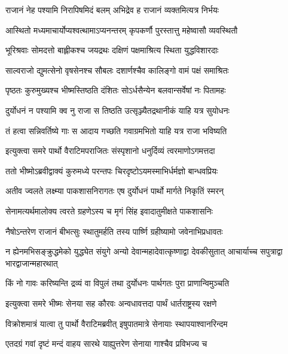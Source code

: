 \twolineshloka
{राजानं नेह पश्यामि निरापिषमिदं बलम्}
{अभिद्रेव ह राजानं व्यक्तमित्यत्र निर्भयः}


\twolineshloka
{आस्थितो मध्यमाचार्योप्यश्वत्थामाऽप्यनन्तरम्}
{कृपकर्णौ पुरस्तात्तु महेष्वासौ व्यवस्थितौ}


\twolineshloka
{भूरिश्रवाः सोमदत्तो बाह्लीकश्च जयद्रथः}
{दक्षिणं पक्षमाश्रित्य स्थिता युद्धविशारदाः}


\twolineshloka
{साल्वराजो द्युमत्सेनो वृषसेनश्च सौबलः}
{दशार्णश्चैव कालिङ्गो वामं पक्षं समाश्रितः}


\twolineshloka
{पृष्ठतः कुरुमुख्यश्च भीष्मस्तिष्ठति दंशितः}
{सोऽर्धसैन्येन बलवान्सर्वेषां नः पितामहः}


\twolineshloka
{दुर्योधनं न पश्यामि क्व नु राजा स तिष्ठति}
{उत्सृञ्ज्यैतद्रथानीकं याहि यत्र सुयोधनः}


\twolineshloka
{तं हत्वा सन्निवर्तिष्ये गाः स आदाय गच्छति}
{गवाग्रमभितो याहि यत्र राजा भविष्यति}



\twolineshloka
{इत्युक्त्वा समरे पार्थो वैराटिमपराजितः}
{संस्पृशानो धनुर्दिव्यं त्वरमाणोऽगमत्तदा}


\twolineshloka
{ततो भीष्मोऽब्रवीद्वाक्यं कुरुमध्ये परन्तपः}
{चिरदृष्टोऽयमस्माभिर्धर्मज्ञो बान्धवप्रियः}



\twolineshloka
{अतीव ज्वलते लक्ष्म्या पाकशासनिरागतः}
{एष दुर्योधनं पार्थो मार्गते निकृतिं स्मरन्}


\twolineshloka
{सेनामत्यर्थमालोक्य त्वरते ग्रहणेऽस्य च}
{मृगं सिंह इवादातुमीक्षते पाकशासनिः}


\twolineshloka
{नैषोऽन्तरेण राजानं बीभत्सुः स्थातुमर्हति}
{तस्य पार्ष्णि ग्रहीष्यामो जवेनाभिप्रधावतः}


\threelineshloka
{न ह्येनमभिसङ्क्रुद्धमेको युद्ध्येत संयुगे}
{अन्यो देवान्महादेवात्कृष्णाद्वा देवकीसुतात्}
{आचार्याच्च सपुत्राद्वा भारद्वाजान्महारथात्}


\twolineshloka
{किं नो गावः करिष्यन्ति द्रव्यं वा विपुलं तथा}
{दुर्योधनः पार्थगतः पुरा प्राणान्विमुञ्चति}



\twolineshloka
{इत्युक्त्वा समरे भीष्मः सेनया सह कौरवः}
{अन्वधावत्तदा पार्थं धार्तराष्ट्रस्य रक्षणे}


\twolineshloka
{विक्रोशमात्रं यात्वा तु पार्थो वैराटिमब्रवीत्}
{इषुपातमात्रे सेनायाः स्थापयाश्वानरिन्दम}


\twolineshloka
{एतदग्रं गवां दृष्टं मन्दं वाहय सारथे}
{याह्युत्तरेण सेनाया गाश्चैव प्रविभज्य च}



